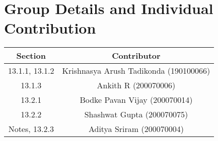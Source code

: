 \documentclass[11pt, twosides]{article}
\begin{document}
\section{Group Details and Individual Contribution}
\begin{center}
    \begin{tabular}{|c | c| }
    \hline 
    Section & Contributor \\ \hline
    13.1.1, 13.1.2 & Krishnasya Arush Tadikonda (190100066) \\ \hline
    13.1.3 & Ankith R (200070006) \\ \hline
    13.2.1 & Bodke Pavan Vijay (200070014) \\ \hline
    13.2.2 & Shashwat Gupta (200070075) \\ \hline
    Notes, 13.2.3 & Aditya Sriram (200070004) \\ \hline
    \end{tabular}
\end{center}
\end{document}

